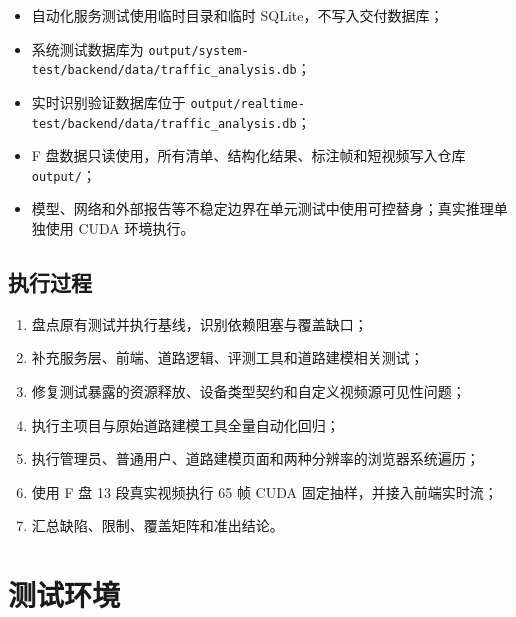 \begin{itemize}
\tightlist
\item
  自动化服务测试使用临时目录和临时 SQLite，不写入交付数据库；
\item
  系统测试数据库为 \texttt{output/\allowbreak{}system-\allowbreak{}test/\allowbreak{}backend/\allowbreak{}data/\allowbreak{}traffic\_\allowbreak{}analysis.\allowbreak{}db}；
\item
  实时识别验证数据库位于 \texttt{output/\allowbreak{}realtime-\allowbreak{}test/\allowbreak{}backend/\allowbreak{}data/\allowbreak{}traffic\_\allowbreak{}analysis.\allowbreak{}db}；
\item
  F 盘数据只读使用，所有清单、结构化结果、标注帧和短视频写入仓库 \texttt{output/\allowbreak{}}；
\item
  模型、网络和外部报告等不稳定边界在单元测试中使用可控替身；真实推理单独使用 CUDA 环境执行。
\end{itemize}

\subsection{执行过程}\label{test-ux6267ux884cux8fc7ux7a0b}

\begin{enumerate}
\def\labelenumi{\arabic{enumi}.}
\tightlist
\item
  盘点原有测试并执行基线，识别依赖阻塞与覆盖缺口；
\item
  补充服务层、前端、道路逻辑、评测工具和道路建模相关测试；
\item
  修复测试暴露的资源释放、设备类型契约和自定义视频源可见性问题；
\item
  执行主项目与原始道路建模工具全量自动化回归；
\item
  执行管理员、普通用户、道路建模页面和两种分辨率的浏览器系统遍历；
\item
  使用 F 盘 13 段真实视频执行 65 帧 CUDA 固定抽样，并接入前端实时流；
\item
  汇总缺陷、限制、覆盖矩阵和准出结论。
\end{enumerate}

\section{测试环境}\label{test-ux6d4bux8bd5ux73afux5883}

